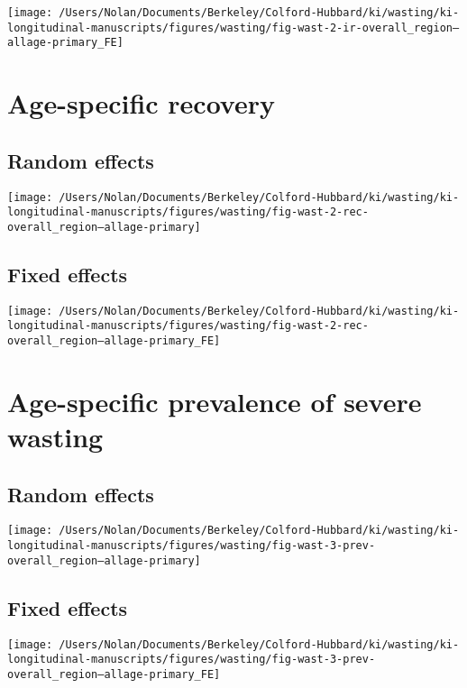 \documentclass[9pt,]{book}
\begin{document}
\texttt{[image: /Users/Nolan/Documents/Berkeley/Colford-Hubbard/ki/wasting/ki-longitudinal-manuscripts/figures/wasting/fig-wast-2-ir-overall\_region--allage-primary\_FE]}

\section{Age-specific recovery}\label{age-specific-recovery}

\subsection{Random effects}\label{random-effects-3}

\texttt{[image: /Users/Nolan/Documents/Berkeley/Colford-Hubbard/ki/wasting/ki-longitudinal-manuscripts/figures/wasting/fig-wast-2-rec-overall\_region--allage-primary]}

\subsection{Fixed effects}\label{fixed-effects-3}

\texttt{[image: /Users/Nolan/Documents/Berkeley/Colford-Hubbard/ki/wasting/ki-longitudinal-manuscripts/figures/wasting/fig-wast-2-rec-overall\_region--allage-primary\_FE]}

\section{Age-specific prevalence of severe
wasting}\label{age-specific-prevalence-of-severe-wasting}

\subsection{Random effects}\label{random-effects-4}

\texttt{[image: /Users/Nolan/Documents/Berkeley/Colford-Hubbard/ki/wasting/ki-longitudinal-manuscripts/figures/wasting/fig-wast-3-prev-overall\_region--allage-primary]}

\subsection{Fixed effects}\label{fixed-effects-4}

\texttt{[image: /Users/Nolan/Documents/Berkeley/Colford-Hubbard/ki/wasting/ki-longitudinal-manuscripts/figures/wasting/fig-wast-3-prev-overall\_region--allage-primary\_FE]}
\end{document}
